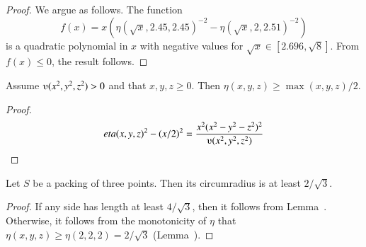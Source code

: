 \begin{tarskidata}
\begin{tarski}
\begin{proof}
We argue as follows. The function
  $$f(x) = x(\eta(\sqrt{x},2.45,2.45)^{-2}-\eta(\sqrt{x},2,2.51)^{-2})
  $$
is a quadratic
polynomial in $x$ with negative values for
$\sqrt{x}\in[2.696,\sqrt{8}]$. From $f(x)\le 0$, the result follows.
\end{proof}
\end{tarski}





\begin{tarski}

\begin{lemma}
Assume $\ups(x^2,y^2,z^2)>0$ and that $x,y,z\ge0$.  Then
$\eta(x,y,z)\ge \max(x,y,z)/2$.
\end{lemma}

\begin{proof} 
  $$\eta(x,y,z)^2 - (x/2)^2 =
  \frac{x^2 (x^2-y^2-z^2)^2}{\ups(x^2,y^2,z^2)}
  $$
\end{proof}
\end{tarski}





\begin{tarski}

\begin{lemma}
Let $S$ be a packing of three points.
 Then its circumradius is at least $2/\sqrt3$.
\end{lemma}

\begin{proof} If any side has length at least $4/\sqrt3$, then
it follows from Lemma~.  Otherwise, it
follows from the monotonicity of $\eta$ that
$\eta(x,y,z)\ge \eta(2,2,2) = 2/\sqrt3$ (Lemma~).
\end{proof}
\end{tarski}

















\end{tarskidata}

